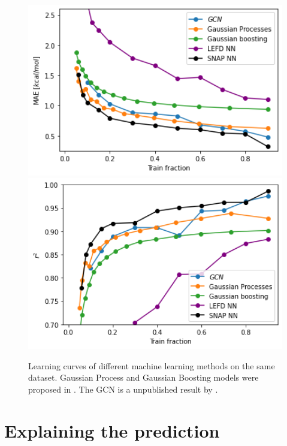 \begin{figure}[!htb]
    \includegraphics[width=1.0\textwidth]{figures/regression/mae-compare.png}
  \endminipage\hfill
  \includegraphics[width=1.0\textwidth]{figures/regression/r2-compare.png}
  \endminipage\hfill  
  \caption[Comparison of learning curves]{
    Learning curves of different machine learning methods on the same dataset.
    Gaussian Process and Gaussian Boosting models were proposed in \cite{friederich_dos}.
    The GCN is a unpublished result by \citeauthor{friederich_dos}.
  }
  \label{fig:comparison}

\end{figure}



\section{Explaining the prediction}

